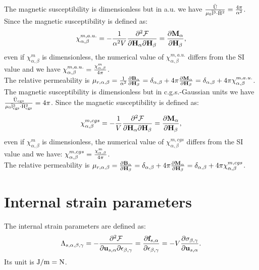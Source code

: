 \documentclass[12pt,a4paper,twoside]{report}
\begin{document}
{\color{web-blue} The magnetic susceptibility is dimensionless but
in a.u. we have
${{\rm \bar U} \over \mu_0 {\rm \bar l}^3\cdot {\rm \bar H}^2}={4\pi \over \alpha^2}$.
Since the magnetic susceptibility is defined as:
\begin{equation}
\chi^{m,a.u.}_{\alpha,\beta}=-{1 \over \alpha^2 V} 
{\partial^2 \mathcal{F} \over \partial 
{\bf H}_{\alpha} \partial {\bf H}_{\beta}}
={\partial {\bf M}_{\alpha} \over \partial {\bf H}_{\beta}},
\end{equation}
even if $\chi^m_{\alpha,\beta}$ is dimensionless,
the numerical value of $\chi^{m,a.u.}_{\alpha,\beta}$ differs from the
SI value and we have
$\chi^{m,a.u.}_{\alpha,\beta} = {\chi^m_{\alpha,\beta} \over 4 \pi}$. \\
The relative permeability is $\mu_{r,\alpha,\beta}=
{1\over \alpha^2}{\partial {\bf B}_{\alpha} \over \partial {\bf H}_\beta}=
\delta_{\alpha,\beta} 
+4 \pi {\partial {\bf M}_\alpha \over \partial {\bf H}_\beta} = 
\delta_{\alpha,\beta} + 
4 \pi \chi^{m,a.u.}_{\alpha,\beta}$.
}
\\

{\color{orange} The magnetic susceptibility is dimensionless but
in c.g.s.-Gaussian units we have
${{\rm \bar U_{cgs}} \over \mu_0 {\rm \bar l_{cgs}}^3 \cdot {\rm \bar H_{cgs}}^2}=
{4\pi}$. Since the magnetic susceptibility is defined as:
\begin{equation}
\chi^{m,cgs}_{\alpha,\beta}=-{1 \over V} 
{\partial^2 \mathcal{F} \over \partial 
{\bf H}_{\alpha} \partial {\bf H}_{\beta}}=
{\partial {\bf M}_{\alpha} \over \partial {\bf H}_{\beta}},
\end{equation}
even if $\chi^m_{\alpha,\beta}$ is dimensionless,
the numerical value of $\chi^{m,cgs}_{\alpha,\beta}$ differs from the
SI value and we have:
$\chi^{m,cgs}_{\alpha,\beta} = {\chi^m_{\alpha,\beta} \over 4 \pi}$. \\
The relative permeability is $\mu_{r,\alpha,\beta}=
{\partial {\bf B}_{\alpha} \over \partial {\bf H}_\beta}=
\delta_{\alpha,\beta} 
+4 \pi {\partial {\bf M}_\alpha \over \partial {\bf H}_\beta} = 
\delta_{\alpha,\beta} + 
4 \pi \chi^{m,cgs}_{\alpha,\beta}$.
}

\newpage
{\color{coral}\section{Internal strain parameters}}
\color{black}

The internal strain parameters are defined as:
\begin{equation}
\Lambda_{s,\alpha,\beta,\gamma}=-{\partial^2 \mathcal{F} \over \partial 
{\bf u}_{s,\alpha} \partial \epsilon_{\beta,\gamma}}
={\partial {\bf f}_{s,\alpha} \over \partial \epsilon_{\beta,\gamma}}
=-V {\partial \sigma_{\beta,\gamma}\over \partial {\bf u}_{s,\alpha}}.
\label{isp}
\end{equation}
Its unit is ${\rm J}/{\rm m}={\rm N}$.
\\
\end{document}
